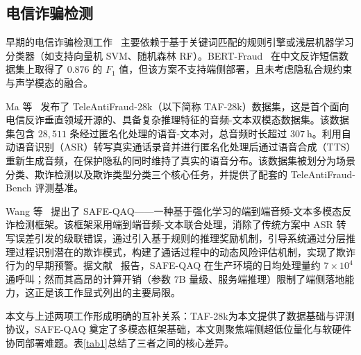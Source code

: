 \documentclass[11pt, a4paper]{article}
\begin{document}
\subsection{电信诈骗检测}
早期的电信诈骗检测工作~\cite{13,14,15} 主要依赖于基于关键词匹配的规则引擎或浅层机器学习分类器（如支持向量机 SVM、随机森林 RF）。BERT-Fraud~\cite{16} 在中文反诈短信数据集上取得了 $0.876$ 的 $F_1$ 值，但该方案不支持端侧部署，且未考虑隐私合规约束与声学模态的融合。

Ma 等~\cite{1} 发布了 TeleAntiFraud-28k（以下简称 TAF-28k）数据集，这是首个面向电信反诈垂直领域开源的、具备复杂推理特征的音频-文本双模态数据集。该数据集包含 $28,511$ 条经过匿名化处理的语音-文本对，总音频时长超过 $307~\text{h}$。利用自动语音识别（ASR）转写真实通话录音并进行匿名化处理后通过语音合成（TTS）重新生成音频，在保护隐私的同时维持了真实的语音分布。该数据集被划分为场景分类、欺诈检测以及欺诈类型分类三个核心任务，并提供了配套的 TeleAntiFraud-Bench 评测基准。

Wang 等~\cite{2} 提出了 SAFE-QAQ——一种基于强化学习的端到端音频-文本多模态反诈检测框架。该框架采用端到端音频-文本联合处理，消除了传统方案中 ASR 转写误差引发的级联错误，通过引入基于规则的推理奖励机制，引导系统通过分层推理过程识别潜在的欺诈模式，构建了通话过程中的动态风险评估机制，实现了欺诈行为的早期预警。据文献~\cite{2} 报告，SAFE-QAQ 在生产环境的日均处理量约 $7\times10^4$ 通呼叫；然而其高昂的计算开销（参数 7B 量级、服务端推理）限制了端侧落地能力，这正是该工作显式列出的主要局限。

本文与上述两项工作形成明确的互补关系：TAF-28k为本文提供了数据基础与评测协议，SAFE-QAQ 奠定了多模态框架基础，本文则聚焦端侧超低位量化与软硬件协同部署难题。表\ref{tab1}总结了三者之间的核心差异。
\end{document}

